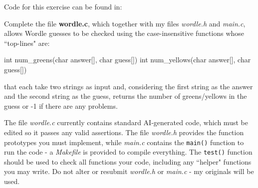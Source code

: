 \begin{exercise}
\noindent Code for this exercise can be found in: 

\noindent Complete the file {\bf wordle.c}, which together with my files {\em wordle.h} and {\em main.c}, allows Wordle guesses to be checked 
using the case-insensitive functions whose ``top-lines" are:
\begin{codesnippet}
int num_greens(char answer[], char guess[])
int num_yellows(char answer[], char guess[])
\end{codesnippet}
\noindent that each take two strings as input and, considering the first string as the answer and the second string as the guess, 
returns the number of greens/yellows in the guess or -1 if there are any problems.
\vspace{6pt}

\noindent The file {\em wordle.c} currently contains standard AI-generated code, which must be edited so it passes any valid assertions. 
The file {\em wordle.h} provides the function prototypes you must implement, while {\em main.c} contains the \verb+main()+ function 
to run the code - a {\em Makefile} is provided to compile everything. The \verb+test()+ function should be used to check all functions your 
code, including any ``helper" functions you may write. Do not alter or resubmit {\em wordle.h} or {\em main.c} - my originals will be used.
\end{exercise}